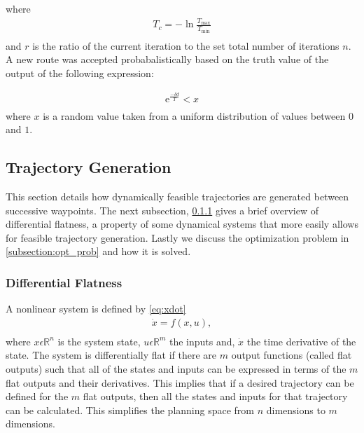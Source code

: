 \documentclass[letterpaper,conference, 10pt]{ieeeconf}
\begin{document}
where 
\begin{equation}
\begin{aligned}
  T_{c} = -\ln{\frac{T_{\text{max}}}{T_{\text{min}}}} \\
  \label{eq:t_c}
  \end{aligned}
\end{equation}
and $r$ is the ratio of the current iteration to the set total number of iterations $n$. A new route was accepted probabalistically based on the truth value of the output of the following expression: 

\begin{equation}
\begin{aligned}
  \text{e}^{\frac{-\delta d}{T}} < x \\
  \label{eq:t_c}
  \end{aligned}
\end{equation}
where $x$ is a random value taken from a uniform distribution of values between $0$ and $1$.

\subsection{Trajectory Generation}

This section details how dynamically feasible trajectories are generated between successive waypoints. The next subsection, \cref{subsection:diff_flat} gives a brief overview of differential flatness, a property of some dynamical systems that more easily allows for feasible trajectory generation. Lastly we discuss the optimization problem in \cref{subsection:opt_prob} and how it is solved.

\subsubsection{Differential Flatness}
\label{subsection:diff_flat}

A nonlinear system is defined by \cref{eq:xdot}
\begin{equation}
\begin{aligned}
  \dot{x} = f(x,u),\\
  \label{eq:xdot}
  \end{aligned}
\end{equation}
where $x \epsilon \mathbb{R}^n$ is the system state, $u \epsilon \mathbb{R}^m$ the inputs and, $\dot{x}$ the time derivative of the state. The system is differentially flat if there are $m$ output functions (called flat outputs) such that all of the states and inputs can be expressed in terms of the $m$ flat outputs and their derivatives. This implies that if a desired trajectory can be defined for the $m$ flat outputs, then all the states and inputs for that trajectory can be calculated. This simplifies the planning space from $n$ dimensions to $m$ dimensions.
\end{document}
